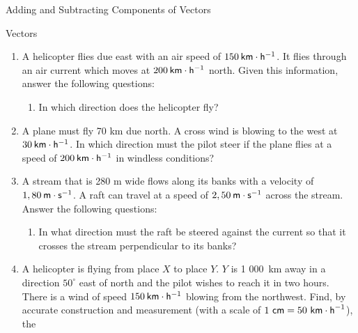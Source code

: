 \begin{exercises}{Adding and Subtracting Components of Vectors}
\begin{eocexercises}{Vectors}
\begin{enumerate}[noitemsep, label=\textbf{\arabic*}.]
            \label{m38819*uid118}\item A helicopter flies due east with an air speed of $150\phantom{\rule{2pt}{0ex}}\mathsf{km}\ensuremath{\cdot}\mathsf{h}{}^{-1}$. It flies through an air current which moves at $200\phantom{\rule{2pt}{0ex}}\mathsf{km}\ensuremath{\cdot}\mathsf{h}{}^{-1}$ north. Given this information, answer the following questions:
\label{m38819*id198203}\begin{enumerate}[noitemsep, label=\textbf{\alph*}. ] 
            \label{m38819*uid119}\item In which direction does the helicopter fly?
\end{enumerate}
                \label{m38819*uid122}\item A plane must fly 70 km due north. A cross wind is blowing to the west at $30\phantom{\rule{2pt}{0ex}}\mathsf{km}\ensuremath{\cdot}\mathsf{h}{}^{-1}$. In which direction must the pilot steer if the plane flies at a speed of $200\phantom{\rule{2pt}{0ex}}\mathsf{km}\ensuremath{\cdot}\mathsf{h}{}^{-1}$ in windless conditions?\newline
\label{m38819*uid123}\item A stream that is 280 m wide flows along its banks with a velocity of $1,80\phantom{\rule{2pt}{0ex}}\mathsf{m}\ensuremath{\cdot}\mathsf{s}{}^{-1}$. A raft can travel at a speed of $2,50\phantom{\rule{2pt}{0ex}}\mathsf{m}\ensuremath{\cdot}\mathsf{s}{}^{-1}$ across the stream. Answer the following questions:
\label{m38819*id198337}\begin{enumerate}[noitemsep, label=\textbf{\alph*}. ] 
\label{m38819*uid126}\item In what direction must the raft be steered against the current so that it crosses the stream perpendicular to its banks?
\end{enumerate}
                \label{m38819*uid128}\item A helicopter is flying from place $X$ to place $Y$. $Y$ is 1 000~km away in a direction ${50}^{\circ }$ east of north and the pilot wishes to reach it in two hours. There is a wind of speed $150\phantom{\rule{2pt}{0ex}}\mathsf{km}\ensuremath{\cdot}\mathsf{h}{}^{-1}$ blowing from the northwest. Find, by accurate construction and measurement (with a scale of $1\phantom{\rule{3.33333pt}{0ex}}\mathsf{cm}=50\phantom{\rule{3.33333pt}{0ex}}{\mathsf{km}\ensuremath{\cdot}\mathsf{h}}^{-1}$), the

\end{enumerate}
\end{eocexercises}
\end{exercises}
